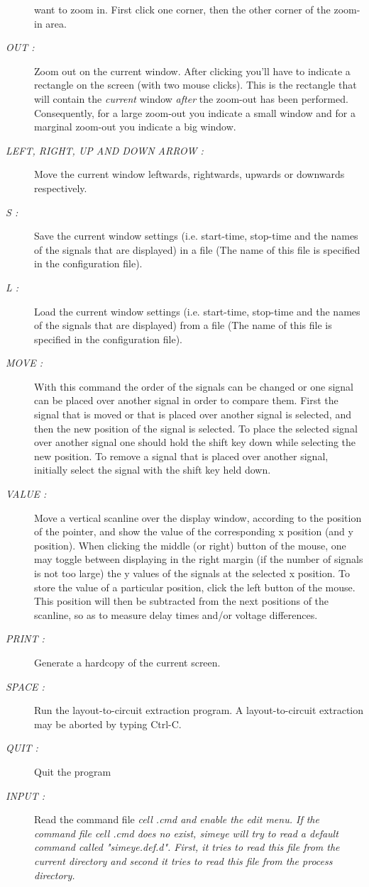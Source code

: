 \begin{description}
want to zoom in. First click one corner, then the other corner of the zoom-in
area.
\item[{\it OUT : }]
Zoom out on the current window. After clicking  you'll have to
indicate a rectangle on the screen (with two mouse clicks). This is the
rectangle that will contain the {\sl current} window {\sl after} the zoom-out
has been performed. Consequently, for a large zoom-out you indicate a small
window and for a marginal zoom-out you indicate a big window.
\item[{\it LEFT, RIGHT, UP AND DOWN ARROW : }]
Move the current window leftwards, rightwards, upwards or downwards
respectively.
\item[{\it S : }]
Save the current window settings (i.e. start-time,
stop-time and the names of the signals that are
displayed) in a file (The name of this file is specified
in the configuration file).
\item[{\it L : }]
Load the current window settings (i.e. start-time,
stop-time and the names of the signals that are
displayed) from a file (The name of this file is specified
in the configuration file).

\item[{\it MOVE : }]
With this command the order of the signals can be changed
or one signal can be placed over another signal
in order to compare them.
First the signal that is moved or that is placed over another signal
is selected,
and then the new position of the signal is selected.
To place the selected signal over another signal one should hold
the shift key down while selecting the new position.
To remove a signal that is placed over another signal,
initially select the signal with the shift key held down.
\item[{\it VALUE : }]
Move a vertical scanline over the display window,
according to the position of the pointer,
and show the value of the corresponding x position (and y position).
When clicking the middle (or right) button of the mouse, one
may toggle between displaying
in the right margin (if the number of signals is not too large)
the y values of the signals at the selected x position.
To store the value of a particular position, click the left 
button of the mouse.
This position will then be subtracted from
the next positions of the scanline,
so as to measure delay times and/or voltage differences.
\item[{\it PRINT : }]
Generate a hardcopy of the current screen.
\item[{\it SPACE : }]
Run the layout-to-circuit extraction program. A
layout-to-circuit extraction may be aborted by typing Ctrl-C.
\item[{\it QUIT : }]
Quit the program
\item[{\it INPUT : }]
Read the command file %
\it cell\rm%
.cmd and
enable the edit menu. 
If the command file %
\it cell\rm%
.cmd does no exist,
{\it simeye}
will try to read a default command called "simeye.def.d".
First, it tries to read this file from the current directory
and second it tries to read this file from the process directory.
\end{description}

